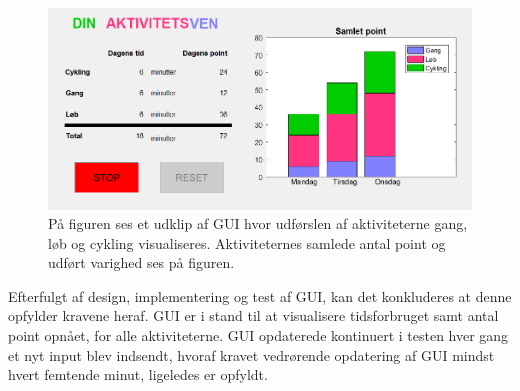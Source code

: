 \begin{figure}[H]
	\centering
	\includegraphics[scale=0.7]{figures/cDesign/test_GUI.png}
	\caption{På figuren ses et udklip af GUI hvor udførslen af aktiviteterne gang, løb og cykling visualiseres. Aktiviteternes samlede antal point og udført varighed ses på figuren.}
	\label{fig:GUI}
\end{figure}

Efterfulgt af design, implementering og test af GUI, kan det konkluderes at denne opfylder kravene heraf. GUI er i stand til at visualisere tidsforbruget samt antal point opnået, for alle aktiviteterne. GUI opdaterede kontinuert i testen hver gang et nyt input blev indsendt, hvoraf kravet vedrørende opdatering af GUI mindst hvert femtende minut, ligeledes er opfyldt.